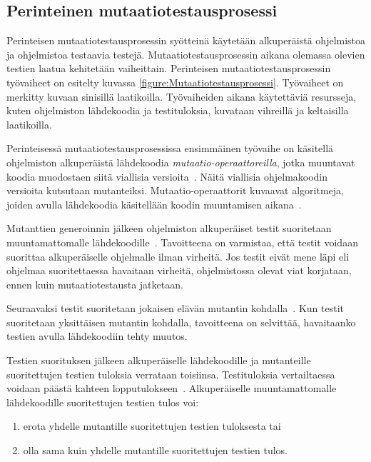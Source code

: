 \documentclass[finnish, grading]{tktltiki2}
\theoremstyle{definition}
\theoremstyle{remark}
\begin{document}

\subsection{Perinteinen mutaatiotestausprosessi}

Perinteisen mutaatiotestausprosessin syötteinä käytetään alkuperäistä ohjelmistoa ja ohjelmistoa testaavia testejä. Mutaatiotestausprosessin aikana olemassa olevien testien laatua kehitetään vaiheittain. Perinteisen mutaatiotestausprosessin työvaiheet on esitelty kuvassa \ref{figure:Mutaatiotestausprosessi}. Työvaiheet on merkitty kuvaan sinisillä laatikoilla. Työvaiheiden aikana käytettäviä resursseja, kuten ohjelmiston lähdekoodia ja testituloksia, kuvataan vihreillä ja keltaisilla laatikoilla.

Perinteisessä mutaatiotestausprosessissa ensimmäinen työvaihe on käsitellä ohjelmiston alkuperäistä lähdekoodia \textit{mutaatio-operaattoreilla}, jotka muuntavat koodia muodostaen siitä viallisia versioita~\cite[s. 869]{Ma:Harrold:Kwon:2006}. Näitä viallisia ohjelmakoodin versioita kutsutaan mutanteiksi. Mutaatio-operaattorit kuvaavat algoritmeja, joiden avulla lähdekoodia käsitellään koodin muuntamisen aikana~\cite[s. 35]{Offutt:Untch:2001}.

Mutanttien generoinnin jälkeen ohjelmiston alkuperäiset testit suoritetaan muuntamattomalle lähdekoodille~\cite[s. 652]{Jia:Harman:2011}. Tavoitteena on varmistaa, että testit voidaan suorittaa alkuperäiselle ohjelmalle ilman virheitä. Jos testit eivät mene läpi eli ohjelmaa suoritettaessa havaitaan virheitä, ohjelmistossa olevat viat korjataan, ennen kuin mutaatiotestausta jatketaan. 

Seuraavaksi testit suoritetaan jokaisen elävän mutantin kohdalla~\cite[s. 35-36]{Offutt:Untch:2001}. Kun testit suoritetaan yksittäisen mutantin kohdalla, tavoitteena on selvittää, havaitaanko testien avulla lähdekoodiin tehty muutos. 

Testien suorituksen jälkeen alkuperäiselle lähdekoodille ja mutanteille suoritettujen testien tuloksia verrataan toisiinsa. Testituloksia vertailtaessa voidaan päästä kahteen lopputulokseen~\cite[s. 36]{DeMillo:Lipton:Sayward:1978}. Alkuperäiselle muuntamattomalle lähdekoodille suoritettujen testien tulos voi: 
\begin{enumerate}
  \item erota yhdelle mutantille suoritettujen testien tuloksesta tai
  \item olla sama kuin yhdelle mutantille suoritettujen testien tulos.
\end{enumerate}
\end{document}
